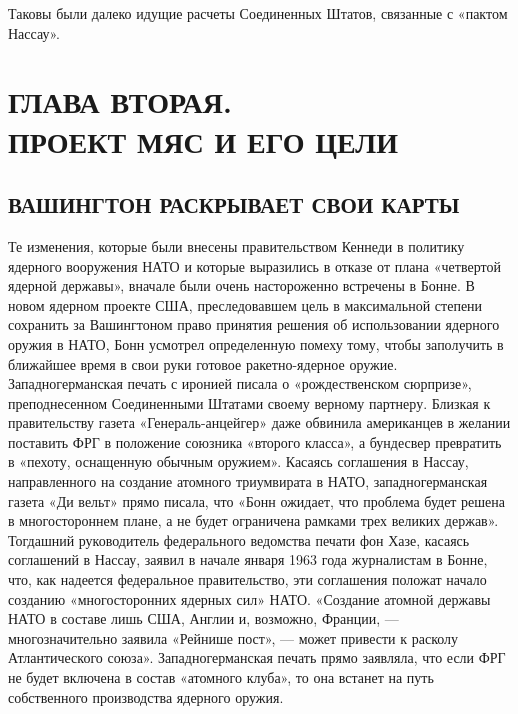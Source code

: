 \documentclass[12pt, a4paper, openany]{book}
\begin{document}
Таковы были далеко идущие расчеты Соединенных Штатов, связанные с «пактом Нассау».
	
	
		\newpage
		\section[Глава вторая. ПРОЕКТ МЯС И ЕГО ЦЕЛИ]{\center ГЛАВА ВТОРАЯ.\\ \textbf{ПРОЕКТ МЯС И ЕГО ЦЕЛИ}}	
	\subsection[Вашингтон раскрывает свои карты]{\center ВАШИНГТОН РАСКРЫВАЕТ СВОИ КАРТЫ}
	

Те изменения, которые были внесены правительством Кеннеди в политику ядерного вооружения НАТО и которые выразились в отказе от плана «четвертой ядерной державы», вначале были очень настороженно встречены в Бонне. В новом ядерном проекте США, преследовавшем цель в максимальной степени сохранить за Вашингтоном право принятия решения об использовании ядерного оружия в НАТО, Бонн усмотрел определенную помеху тому, чтобы заполучить в ближайшее время в свои руки готовое ракетно-ядерное оружие. Западногерманская печать с иронией писала о «рождественском сюрпризе», преподнесенном Соединенными Штатами своему верному партнеру. Близкая к правительству газета «Генераль-анцейгер» даже обвинила американцев в желании поставить ФРГ в положение союзника «второго класса», а бундесвер превратить в «пехоту, оснащенную обычным оружием». Касаясь соглашения в Нассау, направленного на создание атомного триумвирата в НАТО, западногерманская газета «Ди вельт» прямо писала, что «Бонн ожидает, что проблема будет решена в многостороннем плане, а не будет ограничена рамками трех великих держав». Тогдашний руководитель федерального ведомства печати фон Хазе, касаясь соглашений в Нассау, заявил в начале января 1963 года журналистам в Бонне, что, как надеется федеральное правительство, эти соглашения положат начало созданию «многосторонних ядерных сил» НАТО. «Создание атомной державы НАТО в составе лишь США, Англии и, возможно, Франции, — многозначительно заявила «Рейнише пост», — может привести к расколу Атлантического союза». Западногерманская печать прямо заявляла, что если ФРГ не будет включена в состав «атомного клуба», то она встанет на путь собственного производства ядерного оружия.
\end{document}
